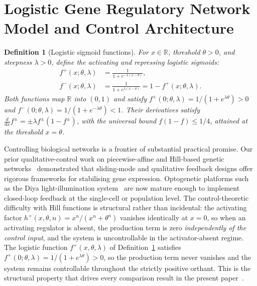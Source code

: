 \documentclass[12pt]{article}
\newtheorem{definition}{Definition}
\begin{document}
\section{Logistic Gene Regulatory Network Model and Control Architecture}
\label{sec:model}

\begin{definition}[Logistic sigmoid functions]
\label{def:logistic}
For $x\in\mathbb{R}$, threshold $\theta>0$, and steepness $\lambda>0$, define the
\emph{activating} and \emph{repressing} logistic sigmoids:
\begin{equation}
\begin{aligned}
f^+(x;\theta,\lambda) &= \frac{1}{1+e^{-\lambda(x-\theta)}}, \\
f^-(x;\theta,\lambda) &= \frac{1}{1+e^{\lambda(x-\theta)}} = 1 - f^+(x;\theta,\lambda).
\end{aligned}
\label{eq:logistic_def}
\end{equation}
Both functions map $\mathbb{R}$ into $(0,1)$ and satisfy
$f^+(0;\theta,\lambda) = 1/(1+e^{\lambda\theta}) > 0$ and
$f^-(0;\theta,\lambda) = 1/(1+e^{-\lambda\theta}) < 1$.
Their derivatives satisfy $\tfrac{d}{dx}f^\pm = \pm\lambda f^\pm(1-f^\pm)$,
with the universal bound $f(1-f)\leq 1/4$, attained at the threshold $x=\theta$.
\end{definition}

Controlling biological networks is a frontier of substantial practical promise.
Our prior qualitative-control work on piecewise-affine and Hill-based
genetic networks~\cite{belgacem2020control,chambon2020qualitative}
demonstrated that sliding-mode and qualitative feedback designs offer
rigorous frameworks for stabilising
gene expression. Optogenetic platforms such as the
Diya light-illumination system~\cite{kumar2023diya} are now mature enough to
implement closed-loop feedback at the single-cell or population level.
The control-theoretic difficulty with Hill functions is structural rather
than incidental: the activating factor
$h^+(x,\theta,n) = x^n/(x^n+\theta^n)$ vanishes identically at $x=0$,
so when an activating regulator is absent, the production term is zero
\emph{independently of the control input}, and the system is uncontrollable
in the activator-absent regime. The logistic function
$f^+(x,\theta,\lambda)$ of Definition~\ref{def:logistic} satisfies
$f^+(0;\theta,\lambda) = 1/(1+e^{\lambda\theta}) > 0$, so the production
term never vanishes and the system remains controllable throughout the
strictly positive orthant. This is the structural property that drives every
comparison result in the present paper~\cite{belgacem2025exploring,belgacem2026logistic}.
\end{document}
